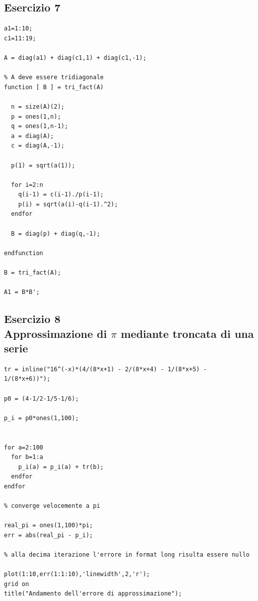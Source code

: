 \documentclass{article}
\begin{document}
\newpage
\subsection{ Esercizio 7}
\begin{lstlisting}
a1=1:10;
c1=11:19;

A = diag(a1) + diag(c1,1) + diag(c1,-1);

% A deve essere tridiagonale
function [ B ] = tri_fact(A)

  n = size(A)(2);
  p = ones(1,n);
  q = ones(1,n-1);
  a = diag(A);
  c = diag(A,-1);

  p(1) = sqrt(a(1));

  for i=2:n
    q(i-1) = c(i-1)./p(i-1);
    p(i) = sqrt(a(i)-q(i-1).^2);
  endfor

  B = diag(p) + diag(q,-1);

endfunction

B = tri_fact(A);

A1 = B*B';

\end{lstlisting}


\newpage
\subsection{ Esercizio 8 \\ Approssimazione di $\pi$ mediante troncata di una serie}
\begin{lstlisting}
tr = inline("16^(-x)*(4/(8*x+1) - 2/(8*x+4) - 1/(8*x+5) - 1/(8*x+6))");

p0 = (4-1/2-1/5-1/6);

p_i = p0*ones(1,100);
	 

for a=2:100
  for b=1:a
    p_i(a) = p_i(a) + tr(b);
  endfor
endfor

% converge velocemente a pi

real_pi = ones(1,100)*pi;
err = abs(real_pi - p_i);

% alla decima iterazione l'errore in format long risulta essere nullo

plot(1:10,err(1:1:10),'linewidth',2,'r');
grid on
title("Andamento dell'errore di approssimazione");

\end{lstlisting}
\end{document}

